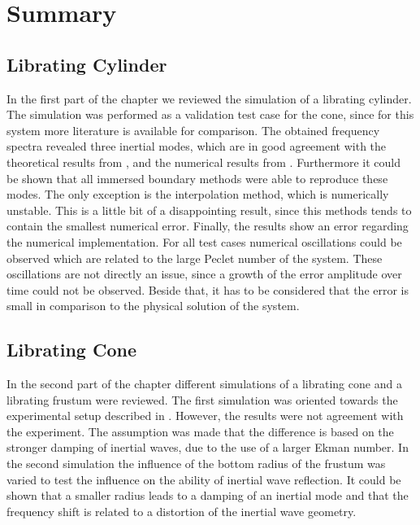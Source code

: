 \section{Summary}

\subsection{Librating Cylinder}


In the first part of the chapter we reviewed the simulation of a librating cylinder.
The simulation was performed as a validation test case for the cone,
since for this system more literature is available for comparison.
The obtained frequency spectra revealed three inertial modes,
which are in good agreement with the theoretical results from \citep{Greenspan1990},  and the  numerical results from \citep{Sauret2012}.
Furthermore it could be shown that all immersed boundary methods were able to reproduce these modes.
The only exception is the interpolation method, which is numerically unstable.
This is a little bit of a disappointing result, since this methods tends to contain
the smallest numerical error.
Finally, the results show an error regarding the numerical implementation.
For all test cases numerical oscillations could be observed which are related to the
large Peclet number of the system.
These oscillations are not directly an issue, since a growth of the error amplitude over time could not be observed.
Beside that, it has to be considered that the error is small in comparison to the physical solution of the system.

\subsection{Librating Cone}

In the second part of the chapter different simulations of
a librating cone and a librating frustum were reviewed.
The first simulation was oriented towards the experimental setup described in \citep{Beardsley1970}.
However, the results  were not agreement with the experiment.
The assumption was made that the difference is based on the  stronger damping of inertial waves,
due to the use of a larger Ekman number.
In the second simulation the influence of the bottom radius of the frustum was varied
to test the influence on the ability of inertial wave reflection.
It could be shown that a smaller radius leads to a damping of an inertial mode and that the frequency
shift is related to a distortion of the inertial wave geometry.

